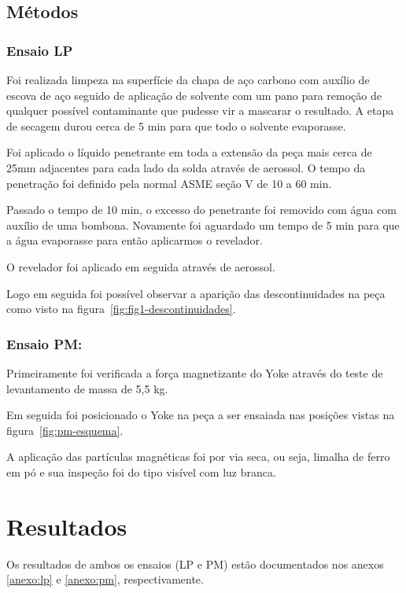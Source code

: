 \documentclass[12pt,oneside]{article}
\begin{document}
\subsection{Métodos}
\subsubsection{Ensaio LP}

Foi realizada limpeza na superfície da chapa de aço carbono com auxílio de
escova de aço seguido de aplicação de solvente com um pano para remoção de
qualquer possível contaminante que pudesse vir a mascarar o resultado.
A etapa de secagem durou cerca de 5 min para que todo o solvente evaporasse.

Foi aplicado o líquido penetrante em toda a extensão da peça mais cerca
de 25mm adjacentes para cada lado da solda através de aerossol. O tempo
da penetração foi definido pela normal ASME seção V de 10 a 60 min.

Passado o tempo de 10 min, o excesso do penetrante foi removido com água
com auxílio de uma bombona. Novamente foi aguardado um tempo de 5 min
para que a água evaporasse para então aplicarmos o revelador.

O revelador foi aplicado em seguida através de aerossol.

Logo em seguida foi possível observar a aparição das descontinuidades na peça
como visto na figura~\ref{fig:fig1-descontinuidades}.

\subsubsection{Ensaio PM:}

Primeiramente foi verificada a força magnetizante do Yoke através do teste
de levantamento de massa de 5,5 kg.

Em seguida foi posicionado o Yoke na peça a ser ensaiada nas posições
vistas na figura~\ref{fig:pm-esquema}.

A aplicação das partículas magnéticas foi por via seca, ou seja, limalha de
ferro em pó e sua inspeção foi do tipo visível com luz branca.

\section{Resultados}
Os resultados de ambos os ensaios (LP e PM) estão documentados nos anexos \ref{anexo:lp} e \ref{anexo:pm}, respectivamente.

\clearpage
\end{document}
